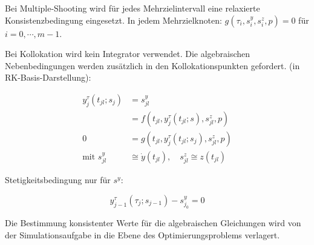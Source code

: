 Bei Multiple-Shooting wird für jedes Mehrzielintervall eine relaxierte Konsistenzbedingung eingesetzt. In jedem Mehrzielknoten: $g(\tau_i, s_i^y, s_i^z, p)=0$ für $i=0,\cdots,m-1$.

Bei Kollokation wird kein Integrator verwendet. Die algebraischen Nebenbedingungen werden zusätzlich in den Kollokationspunkten gefordert. (in RK-Basis-Darstellung):

\begin{align*}
y_j^\tau (t_{jl}; s_j) &= s_{jl}^y \\
&= f(t_{jl}, y_j^\tau(t_{jl};s), s_{jl}^z,p) \\
0 &= g(t_{jl}, y_j^\tau(t_{jl}; s_j), s_{jl}^z, p) \\
\text{mit } s_{jl}^y & \cong \dot y(t_{jl}), \quad s_{jl}^z \cong z(t_{jl})
\end{align*}

Stetigkeitsbedingung nur für $s^y$:

\[ y_{j-1}^\tau (\tau_j; s_{j-1})-s_{j_0}^y = 0 \]

Die Bestimmung konsistenter Werte für die algebraischen Gleichungen wird von der Simulationsaufgabe in die Ebene des Optimierungsproblems verlagert.






